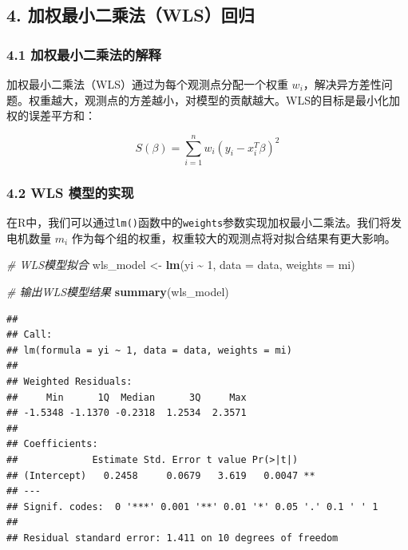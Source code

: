 \documentclass[
  10pt,
]{ctexart}
\newenvironment{Shaded}{\begin{snugshade}}{\end{snugshade}}
\newcommand{\AttributeTok}[1]{\textcolor[rgb]{0.13,0.29,0.53}{#1}}
\newcommand{\CommentTok}[1]{\textcolor[rgb]{0.56,0.35,0.01}{\textit{#1}}}
\newcommand{\DecValTok}[1]{\textcolor[rgb]{0.00,0.00,0.81}{#1}}
\newcommand{\FunctionTok}[1]{\textcolor[rgb]{0.13,0.29,0.53}{\textbf{#1}}}
\newcommand{\NormalTok}[1]{#1}
\newcommand{\OtherTok}[1]{\textcolor[rgb]{0.56,0.35,0.01}{#1}}
\newcommand{\SpecialCharTok}[1]{\textcolor[rgb]{0.81,0.36,0.00}{\textbf{#1}}}
\begin{document}
\hypertarget{ux52a0ux6743ux6700ux5c0fux4e8cux4e58ux6cd5wlsux56deux5f52}{%
\subsection{4.
加权最小二乘法（WLS）回归}\label{ux52a0ux6743ux6700ux5c0fux4e8cux4e58ux6cd5wlsux56deux5f52}}

\hypertarget{ux52a0ux6743ux6700ux5c0fux4e8cux4e58ux6cd5ux7684ux89e3ux91ca}{%
\subsubsection{4.1
加权最小二乘法的解释}\label{ux52a0ux6743ux6700ux5c0fux4e8cux4e58ux6cd5ux7684ux89e3ux91ca}}

加权最小二乘法（WLS）通过为每个观测点分配一个权重
\(w_i\)，解决异方差性问题。权重越大，观测点的方差越小，对模型的贡献越大。WLS的目标是最小化加权的误差平方和：

\[
S(\beta) = \sum_{i=1}^{n} w_i (y_i - x_i^T \beta)^2
\]

\hypertarget{wls-ux6a21ux578bux7684ux5b9eux73b0}{%
\subsubsection{4.2 WLS
模型的实现}\label{wls-ux6a21ux578bux7684ux5b9eux73b0}}

在R中，我们可以通过\texttt{lm()}函数中的\texttt{weights}参数实现加权最小二乘法。我们将发电机数量
\(m_i\) 作为每个组的权重，权重较大的观测点将对拟合结果有更大影响。

\begin{Shaded}
\begin{Highlighting}[]
\CommentTok{\# WLS模型拟合}
\NormalTok{wls\_model }\OtherTok{\textless{}{-}} \FunctionTok{lm}\NormalTok{(yi }\SpecialCharTok{\textasciitilde{}} \DecValTok{1}\NormalTok{, }\AttributeTok{data =}\NormalTok{ data, }\AttributeTok{weights =}\NormalTok{ mi)}

\CommentTok{\# 输出WLS模型结果}
\FunctionTok{summary}\NormalTok{(wls\_model)}
\end{Highlighting}
\end{Shaded}

\begin{verbatim}
## 
## Call:
## lm(formula = yi ~ 1, data = data, weights = mi)
## 
## Weighted Residuals:
##     Min      1Q  Median      3Q     Max 
## -1.5348 -1.1370 -0.2318  1.2534  2.3571 
## 
## Coefficients:
##             Estimate Std. Error t value Pr(>|t|)   
## (Intercept)   0.2458     0.0679   3.619   0.0047 **
## ---
## Signif. codes:  0 '***' 0.001 '**' 0.01 '*' 0.05 '.' 0.1 ' ' 1
## 
## Residual standard error: 1.411 on 10 degrees of freedom
\end{verbatim}
\end{document}
